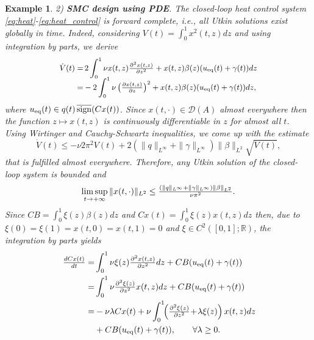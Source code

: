 \documentclass{article}
\newcommand{\R}{\mathbb{R}}
\newcommand{\D}{\mathcal{D}}
\newcommand{\sign}{\mathrm{sign}}
\newtheorem{example}{Example}
\begin{document}
{\begin{example}
 2) \textbf{SMC design using PDE}.	
 The closed-loop heat control system \eqref{eq:heat}-\eqref{eq:heat_control} is forward complete, i.e., all Utkin solutions exist globally in time. 
Indeed, considering $V(t)\!=\!\int^1_0 \!x^2(t,z) dz$ and using integration by parts, we derive\vspace{-1mm}
 \[\vspace{-1mm}\small 
 \begin{split}
 \dot V(t)=&\,2\int^1_0 \nu x(t,z)\tfrac{\partial^2 x(t,z)}{\partial z^2 } +x(t,z) \beta(z) (u_{\rm eq}(t)+\gamma(t))dz\\[-2mm]
=& -2\int^1_0 \nu \left(\tfrac{\partial x(t,z)}{\partial z } \right)^2 +x(t,z) \beta(z) (u_{\rm eq}(t)+\gamma(t))dz,
\end{split}
 \]
 where $u_{\rm eq}(t)\in q(t)\,\overline{\sign}(Cx(t))$.
Since $x(t,\cdot)\in \D(A)$ almost everywhere then the function $z\mapsto x(t,z)$ is continuously differentiable in $z$ for almost all $t$. Using Wirtinger and Cauchy-Schwartz inequalities,  we come up with the estimate
\[
 \dot V(t)\leq -\nu 2\pi^2  V(t)+2(\|q\|_{L^{\infty}}+\|\gamma\|_{L^{\infty}})\|\beta\|_{L^2} \sqrt{V(t)},
\]     
that is fulfilled almost everywhere.
Therefore,  any Utkin solution of the closed-loop system is bounded and  \vspace{-1mm}
 \begin{equation}\label{eq:heat_est_x}
 \limsup_{t\to +\infty} \|x(t,\cdot)\|_{L^2}\leq \tfrac{(\|q\|_{L^{\infty}}+\|\gamma\|_{L^{\infty}})\|\beta\|_{L^2}}{\nu \pi^2}. \vspace{-1mm}
 \end{equation}
Since $CB=\int^1_0 \xi(z)\beta(z) d z$ and $Cx(t)=\int^1_0 \xi(z)x(t,z) dz$ then, due to $\xi(0)=\xi(1)=x(t,0)=x(t,1)=0$ and $\xi\in C^2([0,1];\R)$, the 
 integration by parts yields \vspace{-1mm}
 \begin{equation}\label{eq:input_output_heat_temp}
 \begin{split}
 \tfrac{dCx(t)}{dt}=&\int^1_0  \nu  \xi(z) \tfrac{\partial^2 x(t,z)}{\partial z^2} dz +CB(u_{\rm eq}(t) +\gamma(t))\\
 =&\int^1_0  \nu  \tfrac{\partial^2 \xi(z)}{\partial z^2} x(t,z)dz  + CB(u_{\rm eq}(t) +\gamma(t))\\
 =& -\nu \lambda Cx(t)+\nu \int^1_0  \!\!\left(\tfrac{\partial^2 \xi(z)}{\partial z^2}\!+\!\lambda \xi(z)\right)x(t,z)dz \\
 & + CB(u_{\rm eq}(t) +\gamma(t)), \quad \quad \forall \lambda\geq 0.
 \end{split} \!\vspace{-1mm}

\end{equation}
\end{example}}
\end{document}

